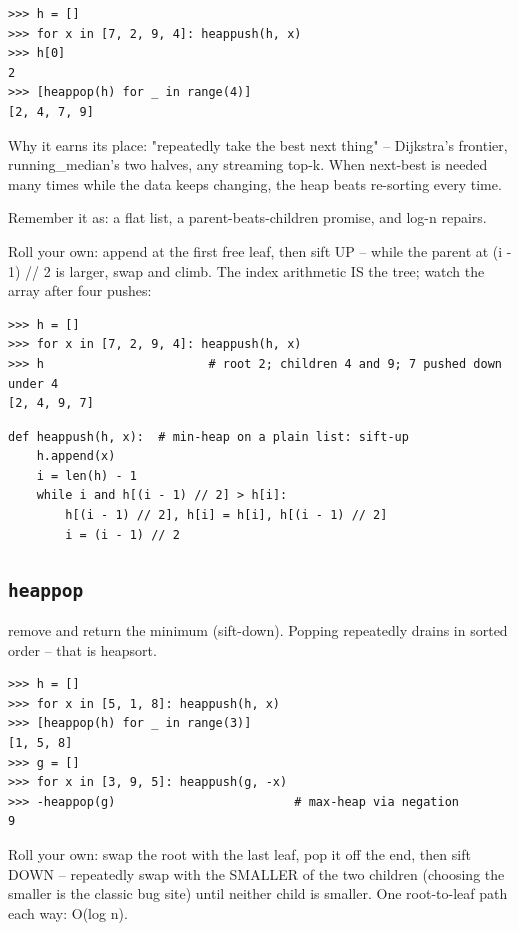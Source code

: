 \documentclass[10pt,letterpaper]{book}
\begin{document}
\begin{lstlisting}[style=ex]
>>> h = []
>>> for x in [7, 2, 9, 4]: heappush(h, x)
>>> h[0]
2
>>> [heappop(h) for _ in range(4)]
[2, 4, 7, 9]
\end{lstlisting}

Why it earns its place: "repeatedly take the best next thing" -- Dijkstra's frontier, running\_median's two halves, any streaming top-k. When next-best is needed many times while the data keeps changing, the heap beats re-sorting every time.


Remember it as: a flat list, a parent-beats-children promise, and log-n repairs.


Roll your own: append at the first free leaf, then sift UP -- while the parent at (i - 1) // 2 is larger, swap and climb. The index arithmetic IS the tree; watch the array after four pushes:

\begin{lstlisting}[style=ex]
>>> h = []
>>> for x in [7, 2, 9, 4]: heappush(h, x)
>>> h                       # root 2; children 4 and 9; 7 pushed down under 4
[2, 4, 9, 7]
\end{lstlisting}
\begin{lstlisting}[style=ex]
def heappush(h, x):  # min-heap on a plain list: sift-up
    h.append(x)
    i = len(h) - 1
    while i and h[(i - 1) // 2] > h[i]:
        h[(i - 1) // 2], h[i] = h[i], h[(i - 1) // 2]
        i = (i - 1) // 2
\end{lstlisting}

\subsection{\texttt{heappop}}\label{def:heappop}
remove and return the minimum (sift-down). Popping repeatedly drains in sorted order -- that is heapsort.
\begin{lstlisting}[style=ex]
>>> h = []
>>> for x in [5, 1, 8]: heappush(h, x)
>>> [heappop(h) for _ in range(3)]
[1, 5, 8]
>>> g = []
>>> for x in [3, 9, 5]: heappush(g, -x)
>>> -heappop(g)                         # max-heap via negation
9
\end{lstlisting}

Roll your own: swap the root with the last leaf, pop it off the end, then sift DOWN -- repeatedly swap with the SMALLER of the two children (choosing the smaller is the classic bug site) until neither child is smaller. One root-to-leaf path each way: O(log n).
\end{document}

